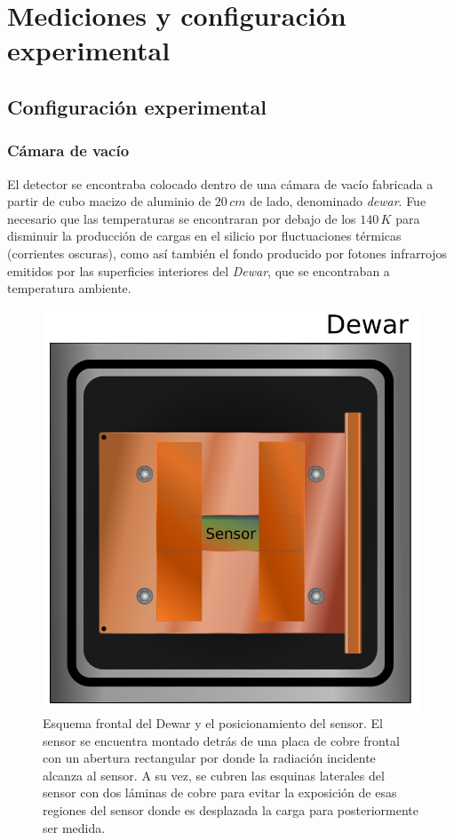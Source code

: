 \chapter{Mediciones y configuración experimental \label{chap:ConfiguracionExperimental}}
\section{Configuración experimental}
\subsection{Cámara de vacío}
\noindent El detector se encontraba colocado dentro de una cámara de vacío fabricada a partir de cubo macizo de aluminio de $20\,\si{cm}$ de lado, denominado \textit{dewar}. Fue necesario que las temperaturas se encontraran por debajo de los $140\,\si{K}$ para disminuir la producción de cargas en el silicio por fluctuaciones térmicas (corrientes oscuras), como así también el fondo producido por fotones infrarrojos emitidos por las superficies interiores del \textit{Dewar}, que se encontraban a temperatura ambiente.
\begin{figure}%
    \centering
    \includegraphics[scale=0.5]{Figs/Frontal_Dewar_Sensor.pdf}
    \caption{\footnotesize{Esquema frontal del Dewar y el posicionamiento del sensor. El sensor se encuentra montado detrás de una placa de cobre frontal con un abertura rectangular por donde la radiación incidente alcanza al sensor. A su vez, se cubren las esquinas laterales del sensor con dos láminas de cobre para evitar la exposición de esas regiones del sensor donde es desplazada la carga para posteriormente ser medida.}}
    \label{fig:FrontalDewarYSensor}
\end{figure}

